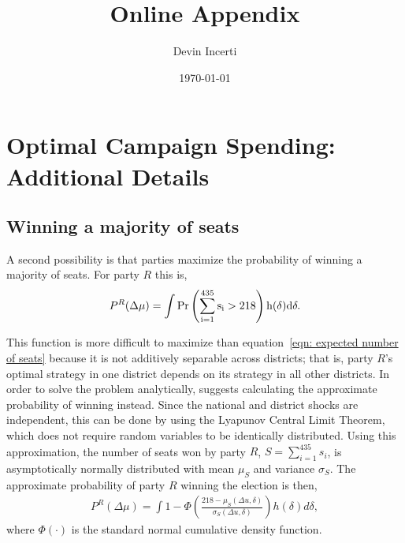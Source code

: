 \documentclass[12pt,final,fleqn]{article}
\theoremstyle{plain}
\begin{document}
\author{Devin Incerti}
\title{\textbf{Online Appendix}}
\date{\today}
\maketitle

\tableofcontents
\listoffigures
\listoftables

\clearpage
\doublespacing

\section{Optimal Campaign Spending: Additional Details}
\subsection{Winning a majority of seats}
A second possibility is that parties maximize the probability of winning a majority of seats. For party $R$ this is,
\begin{align}
P^R(\Delta \mu) = \int \rm{Pr}\left(\sum_{i=1}^{435} s_i > 218 \right) h(\delta)d \delta.
\end{align}

This function is more difficult to maximize than equation~\ref{eqn: expected number of seats} because it is not additively separable across districts; that is, party $R$'s optimal strategy in one district depends on its strategy in all other districts. In order to solve the problem analytically, \citet{stromberg2008electoral} suggests calculating the approximate probability of winning instead. Since the national and district shocks are independent, this can be done by using the Lyapunov Central Limit Theorem, which does not require random variables to be identically distributed. Using this approximation, the number of seats won by party $R$, $S=\sum_{i=1}^{435} s_i$, is asymptotically normally distributed with mean $\mu_S$ and variance $\sigma_S$. The approximate probability of party $R$ winning the election is then,
\begin{align}
P^R(\Delta \mu) = \int 1 - \Phi\left(\frac{218 - \mu_S(\Delta u, \delta)}{\sigma_S(\Delta u, \delta)}\right) h(\delta)d\delta,
\end{align}
where $\Phi(\cdot)$ is the standard normal cumulative density function.
\end{document}
